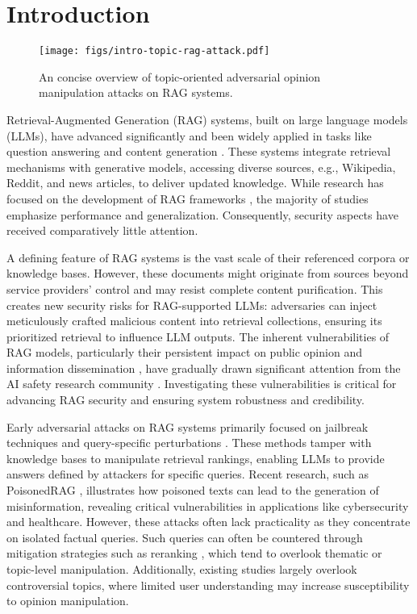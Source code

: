 \section{Introduction}

\begin{figure}[!t]
  \centering
  \texttt{[image: figs/intro-topic-rag-attack.pdf]}
  \caption{An concise overview of topic-oriented adversarial opinion manipulation attacks on RAG systems.}
\end{figure}

Retrieval-Augmented Generation (RAG) systems, built on large language models (LLMs), have advanced significantly and been widely applied in tasks like question answering and content generation \cite{gao2023retrieval,zhao2024retrieval}. These systems integrate retrieval mechanisms with generative models, accessing diverse sources, e.g., Wikipedia, Reddit, and news articles, to deliver updated knowledge. While research has focused on the development of RAG frameworks \cite{asai2023self,shi2025know,xu2024search}, the majority of studies emphasize performance and generalization. Consequently, security aspects have received comparatively little attention.


A defining feature of RAG systems is the vast scale of their referenced corpora or knowledge bases. However, these documents might originate from sources beyond service providers' control and may resist complete content purification. This creates new security risks for RAG-supported LLMs: adversaries can inject meticulously crafted malicious content \cite{carlini2024poisoning} into retrieval collections, ensuring its prioritized retrieval to influence LLM outputs. The inherent vulnerabilities of RAG models, particularly their persistent impact on public opinion and information dissemination \cite{chen2025flipedragblackboxopinionmanipulation}, have gradually drawn significant attention from the AI safety research community \cite{zhong2023poisoning,xue2024badrag,zou2024poisonedrag}. Investigating these vulnerabilities is critical for advancing RAG security and ensuring system robustness and credibility.


Early adversarial attacks on RAG systems primarily focused on jailbreak techniques and query-specific perturbations \cite{chen2025flipedragblackboxopinionmanipulation,zhong2023poisoning}. These methods tamper with knowledge bases to manipulate retrieval rankings, enabling LLMs to provide answers defined by attackers for specific queries. Recent research, such as PoisonedRAG \cite{zou2024poisonedrag}, illustrates how poisoned texts can lead to the generation of misinformation, revealing critical vulnerabilities in applications like cybersecurity and healthcare. However, these attacks often lack practicality as they concentrate on isolated factual queries. Such queries can often be countered through mitigation strategies such as reranking \cite{de2024rag}, which tend to overlook thematic or topic-level manipulation. Additionally, existing studies largely overlook controversial topics, where limited user understanding may increase susceptibility to opinion manipulation.



